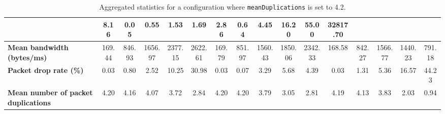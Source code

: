 \begin{table}[!h]
{\begin{tabular}{|l|ccccc|ccccc|ccccc|}
            & \multicolumn{1}{c|}{8.16}
            & \multicolumn{1}{c|}{0.05}
            & \multicolumn{1}{c|}{0.55}
            & \multicolumn{1}{c|}{1.53}
            & \multicolumn{1}{c|}{1.69}
            & \multicolumn{1}{c|}{2.86}
            & \multicolumn{1}{c|}{0.64}
            & \multicolumn{1}{c|}{4.45}
            & \multicolumn{1}{c|}{16.20}
            & \multicolumn{1}{c|}{55.00}
            & \multicolumn{1}{c|}{32817.70}
            \\ \hline
            \textbf{Mean bandwidth (bytes/ms)} & \multicolumn{1}{c|}{169.44} & \multicolumn{1}{c|}{846.93}
            & \multicolumn{1}{c|}{1656.97}
            & \multicolumn{1}{c|}{2377.15}
            & \multicolumn{1}{c|}{2622.61}
            & \multicolumn{1}{c|}{169.79}
            & \multicolumn{1}{c|}{851.97}
            & \multicolumn{1}{c|}{1560.43}
            & \multicolumn{1}{c|}{1850.06}
            & \multicolumn{1}{c|}{2342.33}
            & \multicolumn{1}{c|}{168.58}
            & \multicolumn{1}{c|}{842.27}
            & \multicolumn{1}{c|}{1566.77}
            & \multicolumn{1}{c|}{1440.23}
            & \multicolumn{1}{c|}{791.18}
            \\ \hline
            \textbf{Packet drop rate (\%)} & \multicolumn{1}{c|}{0.03} & \multicolumn{1}{c|}{0.80}
            & \multicolumn{1}{c|}{2.52}
            & \multicolumn{1}{c|}{10.25}
            & \multicolumn{1}{c|}{30.98}
            & \multicolumn{1}{c|}{0.03}
            & \multicolumn{1}{c|}{0.07}
            & \multicolumn{1}{c|}{3.29}
            & \multicolumn{1}{c|}{5.68}
            & \multicolumn{1}{c|}{4.39}
            & \multicolumn{1}{c|}{0.03}
            & \multicolumn{1}{c|}{1.31}
            & \multicolumn{1}{c|}{5.36}
            & \multicolumn{1}{c|}{16.57}
            & \multicolumn{1}{c|}{44.23}
            \\ \hline
            \textbf{Mean number of packet duplications} & \multicolumn{1}{c|}{4.20} & \multicolumn{1}{c|}{4.16}
            & \multicolumn{1}{c|}{4.07}
            & \multicolumn{1}{c|}{3.72}
            & \multicolumn{1}{c|}{2.84}
            & \multicolumn{1}{c|}{4.20}
            & \multicolumn{1}{c|}{4.20}
            & \multicolumn{1}{c|}{3.79}
            & \multicolumn{1}{c|}{3.05}
            & \multicolumn{1}{c|}{2.81}
            & \multicolumn{1}{c|}{4.19}
            & \multicolumn{1}{c|}{4.13}
            & \multicolumn{1}{c|}{3.83}
            & \multicolumn{1}{c|}{2.03}
            & \multicolumn{1}{c|}{0.94}
            \\ \hline
        \end{tabular}
    }
    \caption{Aggregated statistics for a configuration where \texttt{meanDuplications} is set to 4.2.}
    \label{table:analysis_results_duplication}
\end{table}

